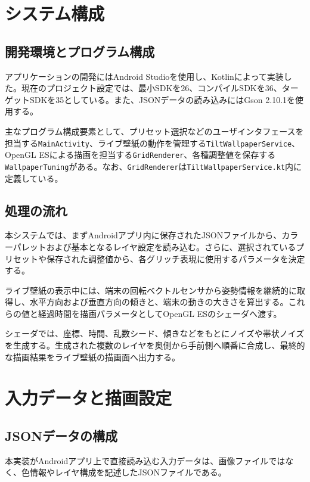 \section{システム構成}

\subsection{開発環境とプログラム構成}

アプリケーションの開発にはAndroid Studioを使用し、Kotlinによって実装した。現在のプロジェクト設定では、最小SDKを26、コンパイルSDKを36、ターゲットSDKを35としている。また、JSONデータの読み込みにはGson 2.10.1を使用する。

主なプログラム構成要素として、プリセット選択などのユーザインタフェースを担当する\texttt{MainActivity}、ライブ壁紙の動作を管理する\texttt{TiltWallpaperService}、OpenGL ESによる描画を担当する\texttt{GridRenderer}、各種調整値を保存する\texttt{WallpaperTuning}がある。なお、\texttt{GridRenderer}は\texttt{TiltWallpaperService.kt}内に定義している。


\subsection{処理の流れ}

本システムでは、まずAndroidアプリ内に保存されたJSONファイルから、カラーパレットおよび基本となるレイヤ設定を読み込む。さらに、選択されているプリセットや保存された調整値から、各グリッチ表現に使用するパラメータを決定する。

ライブ壁紙の表示中には、端末の回転ベクトルセンサから姿勢情報を継続的に取得し、水平方向および垂直方向の傾きと、端末の動きの大きさを算出する。これらの値と経過時間を描画パラメータとしてOpenGL ESのシェーダへ渡す。

シェーダでは、座標、時間、乱数シード、傾きなどをもとにノイズや帯状ノイズを生成する。生成された複数のレイヤを奥側から手前側へ順番に合成し、最終的な描画結果をライブ壁紙の描画面へ出力する。


\section{入力データと描画設定}

\subsection{JSONデータの構成}

本実装がAndroidアプリ上で直接読み込む入力データは、画像ファイルではなく、色情報やレイヤ構成を記述したJSONファイルである。

